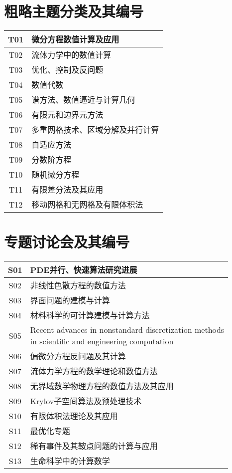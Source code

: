 \documentclass[UTF8]{book}
\begin{document}
\section{粗略主题分类及其编号}
\begin{center}
\begin{tabular}{|c|p{11cm}|}
\hline T01 & 微分方程数值计算及应用 \\
\hline T02 & 流体力学中的数值计算 \\
\hline T03 & 优化、控制及反问题 \\
\hline T04 & 数值代数 \\
\hline T05 & 谱方法、数值逼近与计算几何 \\
\hline T06 & 有限元和边界元方法 \\
\hline T07 & 多重网格技术、区域分解及并行计算 \\
\hline T08 & 自适应方法 \\
\hline T09 & 分数阶方程 \\
\hline T10 & 随机微分方程 \\
\hline T11 & 有限差分法及其应用 \\
\hline T12 & 移动网格和无网格及有限体积法 \\ \hline
\end{tabular}
\end{center}
\section{专题讨论会及其编号}
\begin{center}
\begin{tabular}{|c|p{11cm}|}
\hline S01& PDE并行、快速算法研究进展 \\
\hline S02& 非线性色散方程的数值方法 \\
\hline S03& 界面问题的建模与计算 \\
\hline S04& 材料科学的可计算建模与计算方法 \\
\hline S05& \makecell[l]{Recent advances in nonstandard discretization methods \\ in scientific and engineering computation} \\
\hline S06& 偏微分方程反问题及其计算 \\
\hline S07& 流体力学方程的数学理论和数值方法 \\
\hline S08& 无界域数学物理方程的数值方法及其应用 \\
\hline S09& Krylov子空间算法及预处理技术 \\
\hline S10& 有限体积法理论及其应用 \\
\hline S11& 最优化专题 \\
\hline S12& 稀有事件及其鞍点问题的计算与应用 \\
\hline S13& 生命科学中的计算数学 \\ \hline
\end{tabular}
\end{center}
\end{document}
